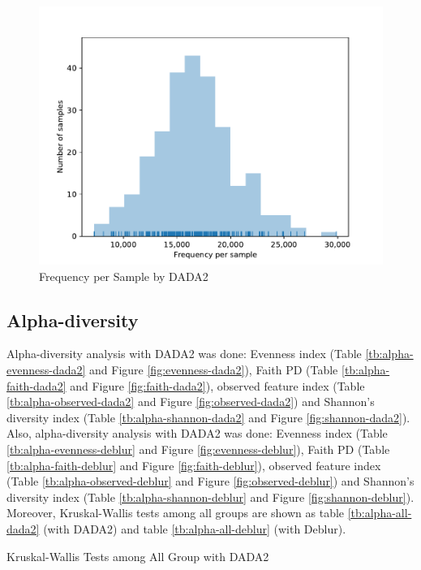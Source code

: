 \documentclass[a4paper]{article}
\begin{document}
            \begin{figure}[p]
                \centering
                \includegraphics[width=0.6 \linewidth]{figures/Rarefaction/Deblur.pdf}
                \caption{Frequency per Sample by DADA2}
                \label{fig:frequency-sample-deblur}
            \end{figure}

        \subsection{Alpha-diversity}
            Alpha-diversity analysis with DADA2 was done: Evenness index (Table \ref{tb:alpha-evenness-dada2} and Figure \ref{fig:evenness-dada2}), Faith PD (Table \ref{tb:alpha-faith-dada2} and Figure \ref{fig:faith-dada2}), observed feature index (Table \ref{tb:alpha-observed-dada2} and Figure \ref{fig:observed-dada2}) and Shannon's diversity index (Table \ref{tb:alpha-shannon-dada2} and Figure \ref{fig:shannon-dada2}). Also, alpha-diversity analysis with DADA2 was done: Evenness index (Table \ref{tb:alpha-evenness-deblur} and Figure \ref{fig:evenness-deblur}), Faith PD (Table \ref{tb:alpha-faith-deblur} and Figure \ref{fig:faith-deblur}), observed feature index (Table \ref{tb:alpha-observed-deblur} and Figure \ref{fig:observed-deblur}) and Shannon's diversity index (Table \ref{tb:alpha-shannon-deblur} and Figure \ref{fig:shannon-deblur}). Moreover, Kruskal-Wallis tests among all groups are shown as table \ref{tb:alpha-all-dada2} (with DADA2) and table \ref{tb:alpha-all-deblur} (with Deblur).

            \begin{table}[p]
                \centering
                \caption{Kruskal-Wallis Tests among All Group with DADA2}
                \label{tb:alpha-all-dada2}
            \end{table}
\end{document}

